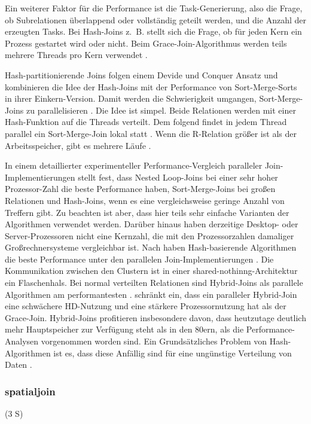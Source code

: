 \documentclass[a4paper,12pt,twoside]{article}
\begin{document}
Ein weiterer Faktor für die Performance ist die Task-Generierung, also die Frage, ob Subrelationen überlappend oder vollständig geteilt werden, und die Anzahl der erzeugten Tasks. Bei Hash-Joins z.~B. stellt sich die Frage, ob für jeden Kern ein Prozess gestartet wird oder nicht. Beim Grace-Join-Algorithmus werden teils mehrere Threads pro Kern verwendet {\autocite{Lu1994}}. 

Hash-partitionierende Joins folgen einem Devide und Conquer Ansatz und kombinieren die Idee der Hash-Joins mit der Performance von Sort-Merge-Sorts in ihrer Einkern-Version. Damit werden die Schwierigkeit umgangen, Sort-Merge-Joins zu parallelisieren {\autocite[S. 75ff]{Mishra199}}. Die Idee ist simpel. Beide Relationen werden mit einer Hash-Funktion auf die Threads verteilt. Dem folgend findet in jedem Thread parallel ein Sort-Merge-Join lokal statt {}. Wenn die R-Relation größer ist als der Arbeitsspeicher, gibt es mehrere Läufe {\autocite{Lu1990}}.


In einem detaillierter experimenteller Performance-Vergleich paralleler Join-Implementierungen stellt {\textcite{Valduriez1984}} fest, dass Nested Loop-Joins bei einer sehr hoher Prozessor-Zahl die beste Performance haben, Sort-Merge-Joins bei großen Relationen und Hash-Joins, wenn es eine vergleichsweise geringe Anzahl von Treffern gibt. Zu beachten ist aber, dass hier teils sehr einfache Varianten der Algorithmen verwendet werden. Darüber hinaus haben derzeitige Desktop- oder Server-Prozessoren nicht eine Kernzahl, die mit den Prozessorzahlen damaliger Großrechnersysteme vergleichbar ist. Nach {\textcite{Richardson1987}} haben Hash-basierende Algorithmen die beste Performance unter den parallelen Join-Implementierungen {\autocite[vgl. auch ]{Gerber1986}}. Die Kommunikation zwischen den Clustern ist in einer shared-nothinng-Architektur ein Flaschenhals. Bei normal verteilten Relationen sind Hybrid-Joins als parallele Algorithmen am performantesten {}. {\textcite{DeWitt1985}} schränkt ein, dass ein paralleler Hybrid-Join eine schwächere HD-Nutzung und eine stärkere Prozessornutzung hat als der Grace-Join. Hybrid-Joins profitieren insbesondere davon, dass heutzutage deutlich mehr Hauptspeicher zur Verfügung steht als in den 80ern, als die Performance-Analysen vorgenommen worden sind. Ein Grundsätzliches Problem von Hash-Algorithmen ist es, dass diese Anfällig sind für eine ungünstige Verteilung von Daten {\autocite{Lakshmi1990}}.


\subsubsection{spatialjoin} (3  S)
\end{document}
